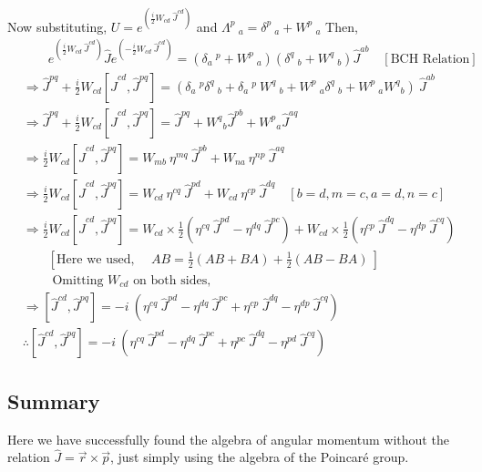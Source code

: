 \documentclass[14pt]{article} %
\begin{document}
Now substituting, $ U=e^{ \left( \frac{i}{2}W_{cd}~\hat{J}^{cd} \right) }$ and $\Lambda^p~_a = \delta^p~_a + W^p~_a $
Then,
\begin{align*}
& \quad \quad e^{ \left( \frac{i}{2}W_{cd}~\hat{J}^{cd} \right) } \hat{J}  e^{ \left( -\frac{i}{2}W_{cd}~\hat{J}^{cd} \right) } = (\delta_a~^p + W^p~_a)(\delta^q~_b + W^q~_b) \hat{J}^{ab} \quad [\text{BCH Relation}]\\
&\Rightarrow \hat{J}^{pq} + \frac{i}{2} W_{cd} [\hat{J}^{cd}, \hat{J}^{pq}] = \left( \delta_a~^p \delta^q~_b + \delta_a~^p~W^q~_b + W^p~_a \delta^q~_b + W^p~_a W^q{}_b \right)~ \hat{J}^{ab} \\
&\Rightarrow \hat{J}^{pq} + \frac{i}{2} W_{cd} [\hat{J}^{cd}, \hat{J}^{pq}] = \hat{J}^{pq} + W^q{}_b \hat{J}^{pb} + W^p{}_a \hat{J}^{a q} \\
&\Rightarrow \frac{i}{2} W_{cd} [\hat{J}^{cd}, \hat{J}^{pq}] = W_{mb}~ \eta^{mq}~\hat{J}^{pb} + W_{na}~ \eta^{np}~\hat{J}^{aq} \\
&\Rightarrow \frac{i}{2} W_{cd} [\hat{J}^{cd}, \hat{J}^{pq}] = W_{cd}~ \eta^{cq}~\hat{J}^{pd} + W_{cd}~ \eta^{cp}~\hat{J}^{dq} \quad [b=d, m=c, a=d, n=c] \\
&\Rightarrow \frac{i}{2} W_{cd} [\hat{J}^{cd}, \hat{J}^{pq}] = W_{cd}\times\frac{1}{2} \left( \eta^{cq}~\hat{J}^{pd} - \eta^{dq}~\hat{J}^{pc} \right) + W_{cd}\times\frac{1}{2} \left( \eta^{cp}~\hat{J}^{dq} - \eta^{dp}~\hat{J}^{cq} \right) \\
& \quad \quad \left[ \text{Here we used, }\quad AB = \frac{1}{2}(AB + BA) + \frac{1}{2}(AB - BA) ~\right] \\
& \quad \quad \text{ Omitting } W_{cd} \text{ on both sides,}\\
&\Rightarrow [\hat{J}^{cd}, \hat{J}^{pq}] = -i~\left( \eta^{cq}~\hat{J}^{pd} - \eta^{dq}~\hat{J}^{pc} + \eta^{cp}~\hat{J}^{dq} - \eta^{dp}~\hat{J}^{cq} \right) \\
& \therefore [\hat{J}^{cd}, \hat{J}^{pq}] = -i~\left( \eta^{cq}~\hat{J}^{pd} - \eta^{dq}~\hat{J}^{pc} + \eta^{pc}~\hat{J}^{dq} - \eta^{pd}~\hat{J}^{cq} \right)
\end{align*}
\subsection*{Summary}
Here we have successfully found the algebra of angular momentum without the relation $\hat{J} = \vec{r} \times \vec{p}$, just simply using the algebra of the Poincaré group.\\
\end{document}
